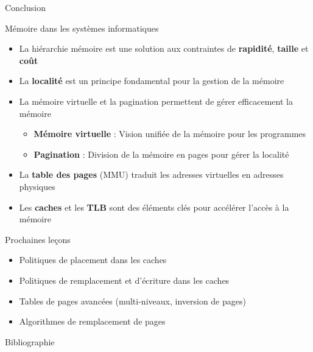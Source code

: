 \documentclass[8pt]{beamer}
\begin{document}
\begin{frame}{Conclusion}
    \begin{block}{Mémoire dans les systèmes informatiques}
        \begin{itemize}
            \item La hiérarchie mémoire est une solution aux
                  contraintes de \textbf{rapidité}, \textbf{taille} et
                  \textbf{coût}
            \item La \textbf{localité} est un principe fondamental pour la
                  gestion
                  de la
                  mémoire
            \item La mémoire virtuelle et la pagination permettent de gérer
                  efficacement la mémoire
                  \begin{itemize}
                      \item \textbf{Mémoire virtuelle} : Vision unifiée de la
                            mémoire pour les programmes
                      \item \textbf{Pagination} : Division de la mémoire en
                            pages pour gérer la
                            localité
                  \end{itemize}
            \item La \textbf{table des pages} (MMU) traduit les adresses
                  virtuelles en adresses physiques
            \item Les \textbf{caches} et les \textbf{TLB} sont des éléments
                  clés pour accélérer
                  l'accès à la mémoire
        \end{itemize}
    \end{block}
    \begin{exampleblock}{Prochaines leçons}
        \begin{itemize}
            \item Politiques de placement dans les caches
            \item Politiques de remplacement et d'\'ecriture dans les caches
            \item Tables de pages avancées (multi-niveaux, inversion de pages)
            \item Algorithmes de remplacement de pages
        \end{itemize}
    \end{exampleblock}
\end{frame}


\begin{frame}{Bibliographie}
    
\end{frame}
\addtocounter{framenumber}{-1}
\end{document}
